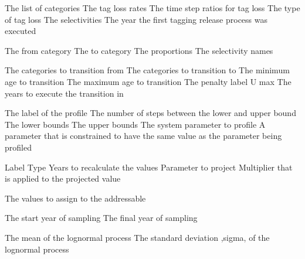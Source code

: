  {The list of categories}
 {The tag loss rates}
 {The time step ratios for tag loss}
 {The type of tag loss}
 {The selectivities}
 {The year the first tagging release process was executed}
\par\textbf{}\par
{} {The from category}
 {The to category}
 {The proportions}
 {The selectivity names}
\par\textbf{}\par
{} {The categories to transition from}
 {The categories to transition to}
 {The minimum age to transition}
 {The maximum age to transition}
 {The penalty label}
 {U max}
 {The years to execute the transition in}
\par\par
{} {The label of the profile}
 {The number of steps between the lower and upper bound}
 {The lower bounds}
 {The upper bounds}
 {The system parameter to profile}
 {A parameter that is constrained to have the same value as the parameter being profiled}
\par\par
{} {Label}
 {Type}
 {Years to recalculate the values}
 {Parameter to project}
 {Multiplier that is applied to the projected value}
\par\textbf{}\par
{} {The values to assign to the addressable}
\par\textbf{}\par
{} {The start year of sampling}
 {The final year of sampling}
\par\textbf{}\par
{} {The mean of the lognormal process}
 {The standard deviation ,sigma, of the lognormal process}
